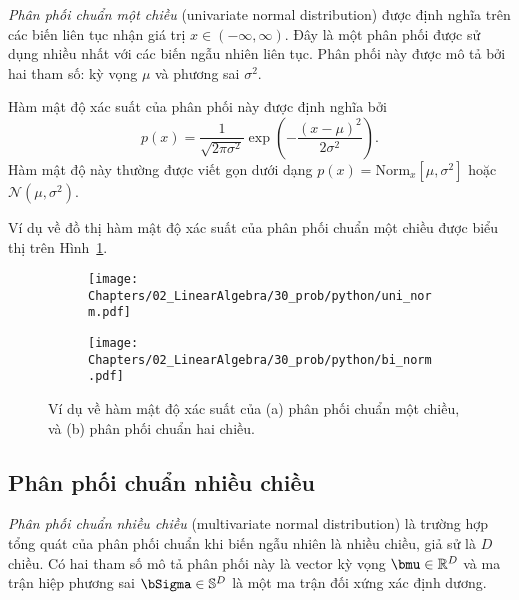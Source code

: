 \textit{Phân phối chuẩn một chiều} (univariate normal distribution) được định nghĩa trên các biến liên tục nhận giá
trị $x \in (-\infty, \infty)$. Đây là một phân phối được sử dụng nhiều nhất với
các biến ngẫu nhiên liên tục. Phân phối này được mô tả bởi hai tham số:
{kỳ vọng} $\mu$ và {phương sai} $\sigma^2$.

Hàm mật độ xác suất của phân phối này được định nghĩa bởi 
\begin{equation}
\label{eqn:30_32}
  p(x) = \frac{1}{\sqrt{2\pi \sigma^2}}\exp \left( -\frac{(x - \mu)^2}{2\sigma^2}\right).
\end{equation}
Hàm mật độ này thường được viết gọn dưới dạng $p(x) = \text{Norm}_x [\mu,
  \sigma^2]$ hoặc $\mathcal{N}(\mu, \sigma^2)$.

Ví dụ về đồ thị hàm mật độ xác suất của phân phối chuẩn một chiều được biểu thị
trên Hình~\ref{fig:30_2a}.

\begin{figure}[t]
    \begin{subfigure}{0.49\textwidth}
    \texttt{[image: Chapters/02\_LinearAlgebra/30\_prob/python/uni\_norm.pdf]}
    \caption{}   
    \label{fig:30_2a}
    \end{subfigure}
    \begin{subfigure}{0.49\textwidth}
    \texttt{[image: Chapters/02\_LinearAlgebra/30\_prob/python/bi\_norm.pdf]}
    \caption{}
    \label{fig:30_2b}
    \end{subfigure}
    \caption{
    Ví dụ về hàm mật độ xác suất của (a) phân phối chuẩn một chiều, và (b) phân
    phối chuẩn hai chiều.}
    \label{fig:30_2}
\end{figure}

\subsection{Phân phối chuẩn nhiều chiều}

\textit{Phân phối chuẩn nhiều chiều} (multivariate normal distribution) là trường hợp tổng quát của phân phối chuẩn khi biến
ngẫu nhiên là nhiều chiều, giả sử là $D$ chiều. Có hai tham số mô tả phân phối
này là {vector kỳ vọng} $\bmu \in \mathbb{R}^D$ và {ma trận hiệp phương sai}
$\bSigma \in \mathbb{S}^D$ là một ma trận {đối xứng xác định dương}.

